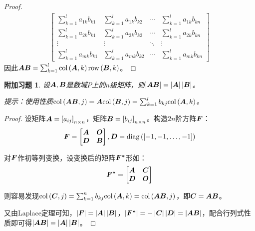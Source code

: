 \documentclass{ctexart}
\newtheorem{extraprob}{附加习题}[section]
\begin{document}
\begin{proof}
\begin{align*}
\begin{bmatrix}
            \sum_{k=1}^la_{1k}b_{k1} & \sum_{k=1}^la_{1k}b_{k2} & \cdots & \sum_{k=1}^la_{1k}b_{kn} \\
            \sum_{k=1}^la_{2k}b_{k1} & \sum_{k=1}^la_{2k}b_{k2} & \cdots & \sum_{k=1}^la_{2k}b_{kn} \\
            \vdots                   & \vdots                   & \ddots & \vdots                   \\
            \sum_{k=1}^la_{mk}b_{k1} & \sum_{k=1}^la_{mk}b_{k2} & \cdots & \sum_{k=1}^la_{mk}b_{kn}
        \end{bmatrix}
    \end{align*}
    因此\(\boldsymbol{A}\boldsymbol{B}=\sum_{k=1}^l\mathrm{col}\left( \boldsymbol{A},k \right)\mathrm{row}\left( \boldsymbol{B},k \right)\)。
\end{proof}

\begin{extraprob}
    设\(\boldsymbol{A},\boldsymbol{B}\)是数域\(P\)上的\(n\)级矩阵，则\(\left|\boldsymbol{A}\boldsymbol{B} \right|=\left|\boldsymbol{A} \right|\left|\boldsymbol{B} \right|\)。

    提示：使用性质\(\mathrm{col}\left( \boldsymbol{A}\boldsymbol{B},j \right)=\boldsymbol{A}\mathrm{col}\left( \boldsymbol{B},j \right)=\sum_{k=1}^lb_{kj}\mathrm{col}\left( \boldsymbol{A},k \right)\)。
\end{extraprob}
\begin{proof}
设矩阵\(\boldsymbol{A}=\left[ a_{ij} \right]_{n\times n}\)，矩阵\(\boldsymbol{B}=\left[ b_{ij} \right]_{n\times n}\)。构造\(2n\)阶方阵\(\boldsymbol{F}\)：
\begin{equation*}
    \boldsymbol{F}=
    \begin{bmatrix}
        \boldsymbol{A} & \boldsymbol{O} \\\boldsymbol{D}&\boldsymbol{B}
    \end{bmatrix},\boldsymbol{D}=\mathrm{diag}\left( \left[ -1,-1,\dots,-1 \right] \right)
\end{equation*}

对\(\boldsymbol{F}\)作初等列变换，设变换后的矩阵\(\boldsymbol{F^*}\)形如：
\begin{equation*}
    \boldsymbol{F^*}=\begin{bmatrix}\boldsymbol{A}&\boldsymbol{C}\\\boldsymbol{D}&\boldsymbol{O}\end{bmatrix}
\end{equation*}

则容易发现\(\mathrm{col}\left( \boldsymbol{C},j \right)=\sum_{k=1}^nb_{kj}\mathrm{col}\left( \boldsymbol{A},k \right)=\mathrm{col}\left( \boldsymbol{A}\boldsymbol{B},j \right)\)，即\(\boldsymbol{C}=\boldsymbol{A}\boldsymbol{B}\)。

又由Laplace定理可知，\(\left|\boldsymbol{F} \right|=\left|\boldsymbol{A} \right|\left|\boldsymbol{B} \right|\)，\(\left|\boldsymbol{F^*} \right|=-\left|\boldsymbol{C} \right|\left|\boldsymbol{D} \right|=\left|\boldsymbol{A}\boldsymbol{B} \right|\)，配合行列式性质即可得\(\left|\boldsymbol{A}\boldsymbol{B} \right|=\left|\boldsymbol{A} \right|\left|\boldsymbol{B} \right|\)。

\end{proof}
\end{document}
